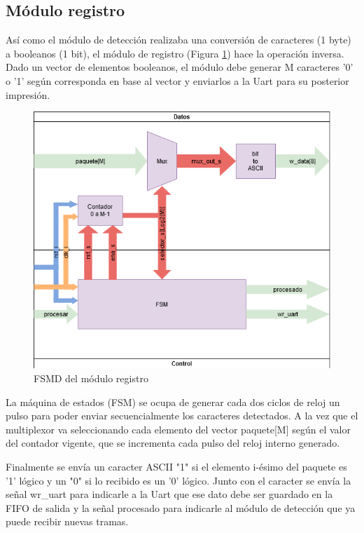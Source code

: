 	\subsection{Módulo registro}
	
		Así como el módulo de detección realizaba una conversión de caracteres (1 byte) a booleanos (1 bit), el módulo de registro (Figura \ref{fig:FSMD_Registro}) hace la operación inversa. Dado un vector de elementos booleanos, el módulo debe generar M caracteres '0' o '1' según corresponda en base al vector y enviarlos a la Uart para su posterior impresión.
		
		\begin{figure}[h]
		\centering
			\includegraphics[scale=.6]{./Figures/FSMD-Registro}
			\caption{FSMD del módulo registro}
			\label{fig:FSMD_Registro}
		\end{figure}

		\vspace{10cm}
		
		La máquina de estados (FSM) se ocupa de generar cada dos ciclos de reloj un pulso para poder enviar secuencialmente los caracteres detectados. A la vez que el multiplexor va seleccionando cada elemento del vector paquete[M] según el valor del contador vigente, que se incrementa cada pulso del reloj interno generado.
		
		Finalmente se envía un caracter ASCII "1" si el elemento i-ésimo del paquete es '1' lógico y un "0" si lo recibido es un '0' lógico. Junto con el caracter se envía la señal wr\_uart para indicarle a la Uart que ese dato debe ser guardado en la FIFO de salida y la señal procesado para indicarle al módulo de detección que ya puede recibir nuevas tramas.
	
